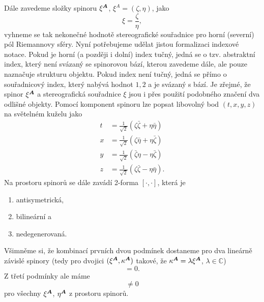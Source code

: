 Dále zavedeme složky spinoru $\xi^{\boldsymbol{A}}$, $\xi^A = (\zeta, \eta)$, jako
\begin{equation}
    \label{eq:zavedeni_slozek_spinoru_z_stereograf_souradnice}
    \xi = \frac{\zeta}{\eta},
\end{equation}
vyhneme se tak nekonečné hodnotě stereografické souřadnice pro horní (severní) pól Riemannovy sféry. Nyní
potřebujeme udělat jistou formalizaci indexové notace.
Pokud je horní (a později i dolní) index tučný, jedná se o tzv. abstraktní index, který není svázaný se
spinorovou bází, kterou zavedeme dále, ale pouze naznačuje strukturu objektu. Pokud index není tučný, jedná
se přímo o souřadnicový index, který nabývá hodnot $1, 2$ a je svázaný s bází. Je zřejmé, že spinor $\xi^{\boldsymbol{A}}$
a stereografická souřadnice $\xi$ jsou i přes použití podobného značení
dva odlišné objekty.
Pomocí komponent spinoru lze popsat libovolný bod $(t, x, y, z)$ na světelném kuželu jako
\begin{equation}
    \label{eq:inverse_spinor_souradnicove}
    \begin{split}
        t &= \frac{1}{\sqrt{2}} \left( \zeta\bar{\zeta} + \eta\bar{\eta} \right) \\
        x &= \frac{1}{\sqrt{2}} \left( \zeta\bar{\eta} + \eta\bar{\zeta} \right) \\
        y &= \frac{1}{\sqrt{2}} \left( \bar{\zeta}\eta - \eta\bar{\zeta} \right) \\
        z &= \frac{1}{\sqrt{2}} \left( \zeta\bar{\zeta} - \eta\bar{\eta} \right).
    \end{split}
\end{equation}
Na prostoru spinorů se dále zavádí 2-forma $[ \cdot , \cdot ]$, která je
\begin{enumerate}[(1)]
    \item antisymetrická,
    \item bilineární a
    \item nedegenerovaná.
\end{enumerate}
Všimněme si, že kombinací prvních dvou podmínek dostaneme pro dva lineárně závislé spinory
(tedy pro dvojici $(\xi^{\boldsymbol{A}}, \kappa^{\boldsymbol{A}})$ takové, že $\kappa^{\boldsymbol{A}} = \lambda \xi^{\boldsymbol{A}}$,
$\lambda \in \mathbb{C}$)
\begin{equation}
    [\xi^\Ab, \kappa^\Ab] = 0.
\end{equation}
Z třetí podmínky ale máme
\begin{equation}
    [\xi^\Ab, \eta^\Ab] \neq 0
\end{equation}
pro všechny $\xi^{\boldsymbol{A}}$, $\eta^{\boldsymbol{A}}$ z prostoru spinorů.

